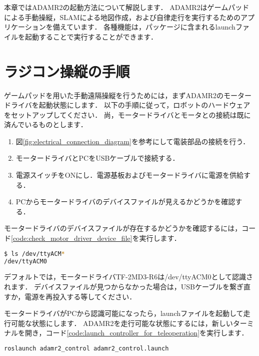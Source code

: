 \documentclass[{../../master}]{subfiles}
\begin{document}
本章ではADAMR2の起動方法について解説します．
ADAMR2はゲームパッドによる手動操縦，SLAMによる地図作成，および自律走行を実行するためのアプリケーションを備えています．
各種機能は，パッケージに含まれるlaunchファイルを起動することで実行することができます．

\section{ラジコン操縦の手順}
\label{sec:teleoperation}

ゲームパッドを用いた手動遠隔操縦を行うためには，まずADAMR2のモータードライバを起動状態にします．
以下の手順に従って，ロボットのハードウェアをセットアップしてください．
尚，モータードライバとモータとの接続は既に済んでいるものとします．

\begin{enumerate}
  \item 図\ref{fig:electrical_connection_diagram}を参考にして電装部品の接続を行う．
  \item モータードライバとPCをUSBケーブルで接続する．
  \item 電源スイッチをONにし．電源基板およびモータードライバに電源を供給する．
  \item PCからモータードライバのデバイスファイルが見えるかどうかを確認する．
\end{enumerate}

モータードライバのデバイスファイルが存在するかどうかを確認するには，コード\ref{code:check_motor_driver_device_file}を実行します．

\begin{lstlisting}[language=sh, label=code:check_motor_driver_device_file, caption=Check the Device File of the Motor Driver]
$ ls /dev/ttyACM*
/dev/ttyACM0
\end{lstlisting}

デフォルトでは，モータードライバTF-2MD3-R6は\textsf{/dev/ttyACM0}として認識されます．
デバイスファイルが見つからなかった場合は，USBケーブルを繋ぎ直すか，電源を再投入する等してください．

モータードライバがPCから認識可能になったら，launchファイルを起動して走行可能な状態にします．
ADAMR2を走行可能な状態にするには，新しいターミナルを開き，コード\ref{code:launch_controller_for_teleoperation}を実行します．

\begin{lstlisting}[language=sh, label=code:launch_controller_for_teleoperation, caption=Launch \textsf{adamr2\_control.launch}]
roslaunch adamr2_control adamr2_control.launch
\end{lstlisting}
\end{document}
